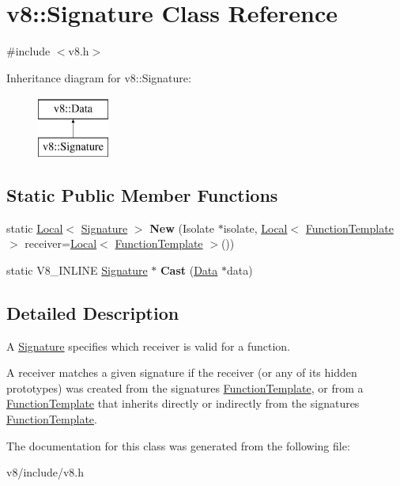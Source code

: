 \hypertarget{classv8_1_1Signature}{}\section{v8\+:\+:Signature Class Reference}
\label{classv8_1_1Signature}


{\ttfamily \#include $<$v8.\+h$>$}

Inheritance diagram for v8\+:\+:Signature\+:\begin{figure}[H]
\begin{center}
\leavevmode
\includegraphics[height=2.000000cm]{classv8_1_1Signature}
\end{center}
\end{figure}
\subsection*{Static Public Member Functions}
\begin{DoxyCompactItemize}
\item 
\mbox{\label{classv8_1_1Signature_a4e3d622674ec1f735e9981ec3309320f}} 
static \mbox{\hyperlink{classv8_1_1Local}{Local}}$<$ \mbox{\hyperlink{classv8_1_1Signature}{Signature}} $>$ {\bfseries New} (Isolate $\ast$isolate, \mbox{\hyperlink{classv8_1_1Local}{Local}}$<$ \mbox{\hyperlink{classv8_1_1FunctionTemplate}{Function\+Template}} $>$ receiver=\mbox{\hyperlink{classv8_1_1Local}{Local}}$<$ \mbox{\hyperlink{classv8_1_1FunctionTemplate}{Function\+Template}} $>$())
\item 
\mbox{\label{classv8_1_1Signature_a9c7566555923187ca55c14af8048a9fc}} 
static V8\+\_\+\+I\+N\+L\+I\+NE \mbox{\hyperlink{classv8_1_1Signature}{Signature}} $\ast$ {\bfseries Cast} (\mbox{\hyperlink{classv8_1_1Data}{Data}} $\ast$data)
\end{DoxyCompactItemize}


\subsection{Detailed Description}
A \mbox{\hyperlink{classv8_1_1Signature}{Signature}} specifies which receiver is valid for a function.

A receiver matches a given signature if the receiver (or any of its hidden prototypes) was created from the signature\textquotesingle{}s \mbox{\hyperlink{classv8_1_1FunctionTemplate}{Function\+Template}}, or from a \mbox{\hyperlink{classv8_1_1FunctionTemplate}{Function\+Template}} that inherits directly or indirectly from the signature\textquotesingle{}s \mbox{\hyperlink{classv8_1_1FunctionTemplate}{Function\+Template}}. 

The documentation for this class was generated from the following file\+:\begin{DoxyCompactItemize}
\item 
v8/include/v8.\+h\end{DoxyCompactItemize}
